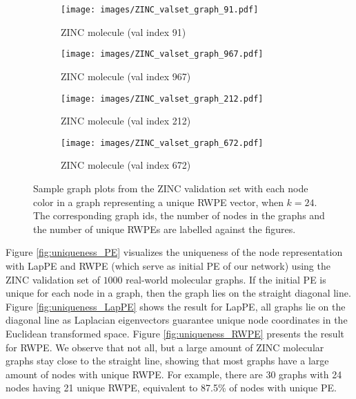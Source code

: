 \documentclass{article} \usepackage{iclr2021_conference,times}
\begin{document}
\begin{figure}[h]
\centering
  \begin{subfigure}{0.4\linewidth}
  \centering
    \texttt{[image: images/ZINC\_valset\_graph\_91.pdf]}
    \vspace{-12pt}
    \caption{ZINC molecule (val index 91)}
    \label{fig:graph_id_91}
  \end{subfigure}
  \hspace{6pt}
  \begin{subfigure}{0.4\linewidth}
  \centering
    \texttt{[image: images/ZINC\_valset\_graph\_967.pdf]}
    \vspace{-12pt}
    \caption{ZINC molecule (val index 967)}
    \label{fig:graph_id_967}
  \end{subfigure}
  \vspace{0.35cm}
  
  \begin{subfigure}{0.4\linewidth}
  \centering
    \texttt{[image: images/ZINC\_valset\_graph\_212.pdf]}
    \vspace{-12pt}
    \caption{ZINC molecule (val index 212)}
    \label{fig:graph_id_212}
  \end{subfigure}
  \hspace{6pt}
  \begin{subfigure}{0.4\linewidth}
  \centering
    \texttt{[image: images/ZINC\_valset\_graph\_672.pdf]}
    \vspace{-12pt}
    \caption{ZINC molecule (val index 672)}
    \label{fig:graph_id_672}
  \end{subfigure}
  \vspace{-5pt}
  \caption{Sample graph plots from the ZINC validation set with each node color in a graph representing a unique RWPE vector, when $k=24$. The corresponding graph ids, the number of nodes in the graphs and the number of unique RWPEs are labelled against the figures.}
  \label{fig:uniqueness_RWPE_graphs}
\end{figure}




Figure \ref{fig:uniqueness_PE} visualizes the uniqueness of the node representation with LapPE and RWPE (which serve as initial PE of our network) using the ZINC validation set of $1000$ real-world molecular graphs. If the initial PE is unique for each node in a graph, then the graph lies on the straight diagonal line. Figure \ref{fig:uniqueness_LapPE} shows the result for LapPE, all graphs lie on the diagonal line as Laplacian eigenvectors guarantee unique node coordinates in the Euclidean transformed space. Figure \ref{fig:uniqueness_RWPE} presents the result for RWPE. We observe that not all, but a large amount of ZINC molecular graphs stay close to the straight line, showing that most graphs have a large amount of nodes with unique RWPE. For example, there are 30 graphs with 24 nodes having 21 unique RWPE, equivalent to 87.5\% of nodes with unique PE.
\end{document}
